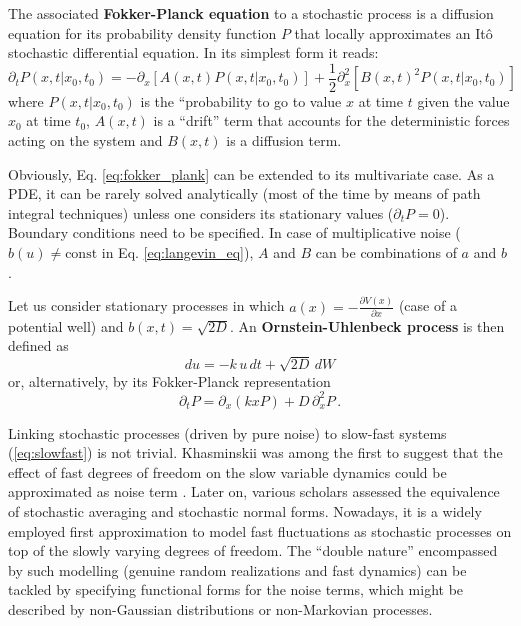 \begin{definition}
	The associated \textbf{Fokker-Planck equation} to a stochastic process is a diffusion equation for its probability density function  $P$ that locally approximates an It\^{o} stochastic differential equation. In its simplest form it reads:
	\begin{equation}
		\partial_t P(x,t | x_0, t_0) = - \partial_x \left[A(x,t) P(x,t | x_0, t_0) \right] + \frac{1}{2} \partial^2_x \left[B(x,t)^2 P(x,t | x_0, t_0) \right]
		\label{eq:fokker_plank}
	\end{equation}
	where $P(x,t | x_0, t_0)$ is the ``probability to go to value $x$ at time $t$ given the value $x_0$ at time $t_0$, $A(x,t)$ is a ``drift'' term that accounts for the deterministic forces acting on the system and $B(x,t)$ is a diffusion term.
\end{definition}
Obviously, Eq. \ref{eq:fokker_plank} can be extended to its multivariate case. As a PDE, it can be rarely solved analytically (most of the time by means of path integral techniques) unless one considers its stationary values ($\partial_t P =0$). Boundary conditions need to be specified. In case of multiplicative noise ($b(u) \neq \text{const}$ in Eq. \ref{eq:langevin_eq}), $A$ and $B$ can be combinations of $a$ and $b$ \citep{Risken1991}. 

\begin{definition}
	Let us consider stationary processes in which $a(x) = -\frac{\partial V(x)}{\partial x}$ (case of a potential well) and $b(x,t) = \sqrt{2D}$. An \textbf{Ornstein-Uhlenbeck process} is then defined as 
	\begin{equation}
		du = -k \, u \, dt + \sqrt{2D} \, dW
		\label{eq:o-u}
	\end{equation}
	or, alternatively, by its Fokker-Planck representation
	\begin{equation}
		\partial_t P = \partial_x (kxP) + D \, \partial^2_x P \, .
	\end{equation}
\end{definition}


Linking stochastic processes (driven by pure noise) to slow-fast systems (\ref{eq:slowfast}) is not trivial. Khasminskii was among the first to suggest that the effect of fast degrees of freedom on the slow variable dynamics could be approximated as noise term \citep{khas1966limit}. Later on, various scholars \citep{namachchivaya1990equivalence} assessed the equivalence of stochastic averaging and stochastic normal forms. Nowadays, it is a widely employed first approximation \citep{Berglund2006} to model fast fluctuations as stochastic processes on top of the slowly varying degrees of freedom. The ``double nature'' encompassed by such modelling (genuine random realizations and fast dynamics) can be tackled by specifying functional forms for the noise terms, which might be described by non-Gaussian distributions or non-Markovian processes.





